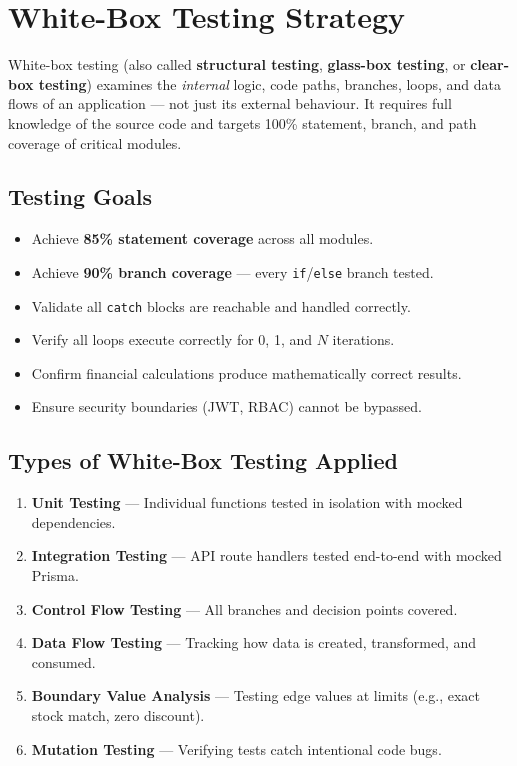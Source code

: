 ﻿\documentclass[12pt,a4paper]{report}
\begin{document}
\section{White-Box Testing Strategy}

\begin{tcolorbox}[infobox,title={What is White-Box Testing?}]
White-box testing (also called \textbf{structural testing}, \textbf{glass-box testing}, or \textbf{clear-box testing}) examines the \emph{internal} logic, code paths, branches, loops, and data flows of an application --- not just its external behaviour. It requires full knowledge of the source code and targets 100\% statement, branch, and path coverage of critical modules.
\end{tcolorbox}

\subsection{Testing Goals}

\begin{itemize}[leftmargin=1.5em]
  \item Achieve \textbf{85\% statement coverage} across all modules.
  \item Achieve \textbf{90\% branch coverage} --- every \texttt{if}/\texttt{else} branch tested.
  \item Validate all \texttt{catch} blocks are reachable and handled correctly.
  \item Verify all loops execute correctly for 0, 1, and $N$ iterations.
  \item Confirm financial calculations produce mathematically correct results.
  \item Ensure security boundaries (JWT, RBAC) cannot be bypassed.
\end{itemize}

\subsection{Types of White-Box Testing Applied}

\begin{enumerate}[leftmargin=1.5em]
  \item \textbf{Unit Testing} --- Individual functions tested in isolation with mocked dependencies.
  \item \textbf{Integration Testing} --- API route handlers tested end-to-end with mocked Prisma.
  \item \textbf{Control Flow Testing} --- All branches and decision points covered.
  \item \textbf{Data Flow Testing} --- Tracking how data is created, transformed, and consumed.
  \item \textbf{Boundary Value Analysis} --- Testing edge values at limits (e.g., exact stock match, zero discount).
  \item \textbf{Mutation Testing} --- Verifying tests catch intentional code bugs.
\end{enumerate}
\end{document}
